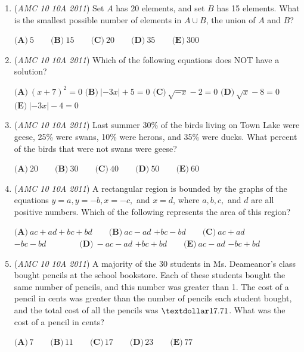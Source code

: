 \begin{enumerate}
 $\textbf{(A)}\ 12 \qquad\textbf{(B)}\  \frac{37}{3} \qquad\textbf{(C)}\  \frac{88}{7} \qquad\textbf{(D)}\ 13\qquad\textbf{(E)}\ 14$


	\item (\textit{AMC 10 10A 2011}) Set $A$ has 20 elements, and set $B$ has 15 elements. What is the smallest possible number of elements in $A   \cup  B$, the union of $A$ and $B$?


 $\textbf{(A)}\ 5 \qquad\textbf{(B)}\ 15 \qquad\textbf{(C)}\ 20\qquad\textbf{(D)}\ 35\qquad\textbf{(E)}\ 300$


	\item (\textit{AMC 10 10A 2011}) Which of the following equations does NOT have a solution?


 $\textbf{(A)}\:(x+7)^2=0$
$\textbf{(B)}\:\left|-3x\right|+5=0$
$\textbf{(C)}\:\sqrt{-x}-2=0$
$\textbf{(D)}\:\sqrt{x}-8=0$
$\textbf{(E)}\:\left|-3x\right|-4=0$


	\item (\textit{AMC 10 10A 2011}) Last summer 30\% of the birds living on Town Lake were geese, 25\% were swans, 10\% were herons, and 35\% were ducks. What percent of the birds that were not swans were geese?


 $\textbf{(A)}\ 20 \qquad\textbf{(B)}\ 30 \qquad\textbf{(C)}\ 40\qquad\textbf{(D)}\ 50\qquad\textbf{(E)}\ 60$


	\item (\textit{AMC 10 10A 2011}) A rectangular region is bounded by the graphs of the equations $y=a, y=-b, x=-c,$ and $x=d$, where $a,b,c,$ and $d$ are all positive numbers. Which of the following represents the area of this region?


 $\textbf{(A)}\ ac+ad+bc+bd\qquad\textbf{(B)}\ ac-ad$ $+bc-bd\qquad\textbf{(C)}\ ac+ad$ $-bc-bd   \quad\quad\qquad\textbf{(D)}\ -ac-ad$ $+bc+bd\qquad\textbf{(E)}\ ac-ad$ $-bc+bd$


	\item (\textit{AMC 10 10A 2011}) A majority of the 30 students in Ms. Deameanor's class bought pencils at the school bookstore.  Each of these students bought the same number of pencils, and this number was greater than 1.  The cost of a pencil in cents was greater than the number of pencils each student bought, and the total cost of all the pencils was $\textdollar 17.71$.  What was the cost of a pencil in cents?


 $\textbf{(A)}\,7 \qquad\textbf{(B)}\,11 \qquad\textbf{(C)}\,17 \qquad\textbf{(D)}\,23 \qquad\textbf{(E)}\,77$



\end{enumerate}
